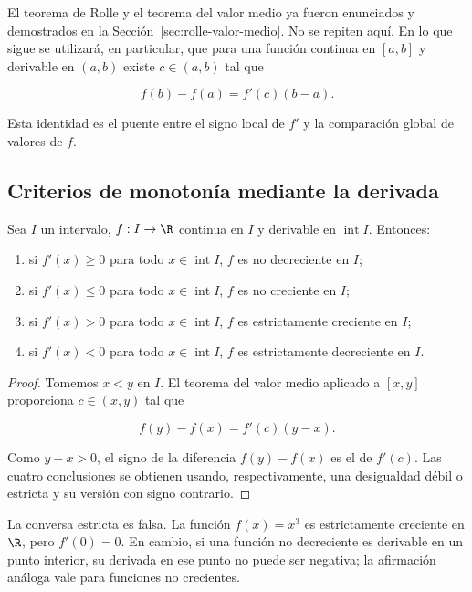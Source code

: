 El teorema de Rolle y el teorema del valor medio ya fueron enunciados y
demostrados en la Sección~\ref{sec:rolle-valor-medio}. No se repiten aquí. En
lo que sigue se utilizará, en particular, que para una función continua en
\([a,b]\) y derivable en \((a,b)\) existe \(c\in(a,b)\) tal que

\[
  f(b)-f(a)=f'(c)(b-a).
\]

Esta identidad es el puente entre el signo local de \(f'\) y la comparación
global de valores de \(f\).

\subsection{Criterios de monotonía mediante la derivada}

\begin{teorema}
Sea \(I\) un intervalo, \(f:I\to\R\) continua en \(I\) y derivable en
\(\operatorname{int}I\). Entonces:

\begin{enumerate}
  \item si \(f'(x)\ge0\) para todo \(x\in\operatorname{int}I\), \(f\) es no
        decreciente en \(I\);
  \item si \(f'(x)\le0\) para todo \(x\in\operatorname{int}I\), \(f\) es no
        creciente en \(I\);
  \item si \(f'(x)>0\) para todo \(x\in\operatorname{int}I\), \(f\) es
        estrictamente creciente en \(I\);
  \item si \(f'(x)<0\) para todo \(x\in\operatorname{int}I\), \(f\) es
        estrictamente decreciente en \(I\).
\end{enumerate}
\end{teorema}

\begin{proof}
Tomemos \(x<y\) en \(I\). El teorema del valor medio aplicado a \([x,y]\)
proporciona \(c\in(x,y)\) tal que

\[
  f(y)-f(x)=f'(c)(y-x).
\]

Como \(y-x>0\), el signo de la diferencia \(f(y)-f(x)\) es el de \(f'(c)\).
Las cuatro conclusiones se obtienen usando, respectivamente, una desigualdad
débil o estricta y su versión con signo contrario.
\end{proof}

La conversa estricta es falsa. La función \(f(x)=x^3\) es estrictamente
creciente en \(\R\), pero \(f'(0)=0\). En cambio, si una función no
decreciente es derivable en un punto interior, su derivada en ese punto no
puede ser negativa; la afirmación análoga vale para funciones no crecientes.

